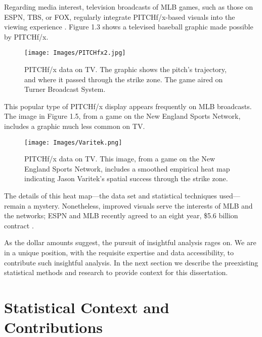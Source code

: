 Regarding media interest, television broadcasts of MLB\textsuperscript{\textregistered} games, such as those on ESPN, TBS, or FOX, regularly integrate PITCHf/x\textsuperscript{\textregistered}-based visuals into the viewing experience \citep{Cross2015}. Figure 1.3 shows a televised baseball graphic made possible by PITCHf/x\textsuperscript{\textregistered}.
        \begin{figure}[H]
      	\centering
      	\texttt{[image: Images/PITCHfx2.jpg]} 
      	\caption{PITCHf/x\textsuperscript{\textregistered} data on TV. The graphic shows the pitch's trajectory, and where it passed through the strike zone. The game aired on Turner Broadcast System.} %
      	\end{figure} 
This popular type of PITCHf/x\textsuperscript{\textregistered} display appears frequently on MLB\textsuperscript{\textregistered} broadcasts. The image in Figure 1.5, from a game on the New England Sports Network, includes a graphic much less common on TV.
        \begin{figure}[H]
      	\centering
      	\texttt{[image: Images/Varitek.png]} 
      	\caption{PITCHf/x\textsuperscript{\textregistered} data on TV. This image, from a game on the New England Sports Network, includes a smoothed empirical heat map indicating Jason Varitek's spatial success through the strike zone.} 
      	\end{figure} 
The details of this heat map---the data set and statistical techniques used---remain a mystery. Nonetheless, improved visuals serve the interests of MLB\textsuperscript{\textregistered} and the networks; ESPN\textsuperscript{\textregistered} and MLB\textsuperscript{\textregistered} recently agreed to an eight year, \$5.6 billion contract \citep{Newman2012}.

As the dollar amounts suggest, the pursuit of insightful analysis rages on. We are in a unique position, with the requisite expertise and data accessibility, to contribute such insightful analysis. In the next section we describe the preexisting statistical methods and research to provide context for this dissertation.

\section{Statistical Context and Contributions}

